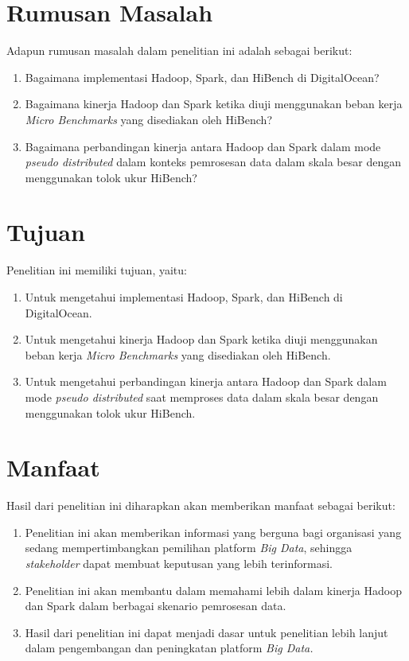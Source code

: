 \section{Rumusan Masalah}
Adapun rumusan masalah dalam penelitian ini adalah sebagai berikut:
\begin{enumerate}
	\item Bagaimana implementasi Hadoop, Spark, dan HiBench di DigitalOcean?
	\item Bagaimana kinerja Hadoop dan Spark ketika diuji menggunakan  beban kerja \textit{Micro Benchmarks} yang disediakan oleh HiBench?
	\item Bagaimana perbandingan kinerja antara Hadoop dan Spark dalam mode \textit{pseudo distributed} dalam konteks pemrosesan data dalam skala besar dengan menggunakan tolok ukur HiBench?
\end{enumerate}

\section{Tujuan}
Penelitian ini memiliki tujuan, yaitu:
	\begin{enumerate}
		\item Untuk mengetahui implementasi Hadoop, Spark, dan HiBench di DigitalOcean.
		\item Untuk mengetahui kinerja Hadoop dan Spark ketika diuji menggunakan  beban kerja \textit{Micro Benchmarks} yang disediakan oleh HiBench.
		\item Untuk mengetahui perbandingan kinerja antara Hadoop dan Spark dalam mode \textit{pseudo distributed} saat memproses data dalam skala besar dengan menggunakan tolok ukur HiBench.
	\end{enumerate}

\section{Manfaat}
Hasil dari penelitian ini diharapkan akan memberikan manfaat sebagai berikut:
\begin{enumerate}
	\item 
	Penelitian ini akan memberikan informasi yang berguna bagi organisasi yang sedang mempertimbangkan pemilihan platform \textit{Big Data}, sehingga \textit{stakeholder} dapat membuat keputusan yang lebih terinformasi.	
	\item
	Penelitian ini akan membantu dalam memahami lebih dalam kinerja Hadoop dan Spark dalam berbagai skenario pemrosesan data.
	\item
	Hasil dari penelitian ini dapat menjadi dasar untuk penelitian lebih lanjut dalam pengembangan dan peningkatan platform \textit{Big Data.}
\end{enumerate}

